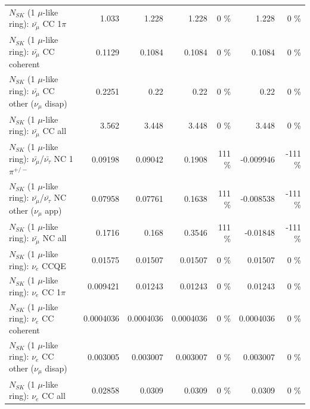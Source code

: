 \begin{table}
\begin{tabular}{| l | r | r | r  r | r  r |}
                         $N_{SK}$ (1 $\mu$-like ring): $\bar{\nu_\mu}$ CC 1$\pi$ &           1.033 &           1.228 &           1.228 &        0 \%  &           1.228 &        0 \%  \\ 
                       $N_{SK}$ (1 $\mu$-like ring): $\bar{\nu_\mu}$ CC coherent &          0.1129 &          0.1084 &          0.1084 &        0 \%  &          0.1084 &        0 \%  \\ 
        $N_{SK}$ (1 $\mu$-like ring): $\bar{\nu_\mu}$ CC other ($\nu_\mu$ disap) &          0.2251 &            0.22 &            0.22 &        0 \%  &            0.22 &        0 \%  \\ 
                          $N_{SK}$ (1 $\mu$-like ring): $\bar{\nu_{\mu}}$ CC all &           3.562 &           3.448 &           3.448 &        0 \%  &           3.448 &        0 \%  \\ 
\hline
  $N_{SK}$ (1 $\mu$-like ring): $\bar{\nu_\mu}$/$\bar{\nu_\tau}$ NC 1$\pi^{+/-}$ &         0.09198 &         0.09042 &          0.1908 &      111 \%  &       -0.009946 &     -111 \%  \\ 
$N_{SK}$ (1 $\mu$-like ring): $\bar{\nu_\mu}$/$\bar{\nu_\tau}$ NC other ($\nu_\mu$ app) &         0.07958 &         0.07761 &          0.1638 &      111 \%  &       -0.008538 &     -111 \%  \\ 
                          $N_{SK}$ (1 $\mu$-like ring): $\bar{\nu_{\mu}}$ NC all &          0.1716 &           0.168 &          0.3546 &      111 \%  &        -0.01848 &     -111 \%  \\ 
\hline
\hline
\hline
                                      $N_{SK}$ (1 $\mu$-like ring): $\nu_e$ CCQE &         0.01575 &         0.01507 &         0.01507 &        0 \%  &         0.01507 &        0 \%  \\ 
                                 $N_{SK}$ (1 $\mu$-like ring): $\nu_e$ CC 1$\pi$ &        0.009421 &         0.01243 &         0.01243 &        0 \%  &         0.01243 &        0 \%  \\ 
                               $N_{SK}$ (1 $\mu$-like ring): $\nu_e$ CC coherent &       0.0004036 &       0.0004036 &       0.0004036 &        0 \%  &       0.0004036 &        0 \%  \\ 
                $N_{SK}$ (1 $\mu$-like ring): $\nu_e$ CC other ($\nu_\mu$ disap) &        0.003005 &        0.003007 &        0.003007 &        0 \%  &        0.003007 &        0 \%  \\ 
                                  $N_{SK}$ (1 $\mu$-like ring): $\nu_{e}$ CC all &         0.02858 &          0.0309 &          0.0309 &        0 \%  &          0.0309 &        0 \%  \\ 

\end{tabular}
\end{table}
